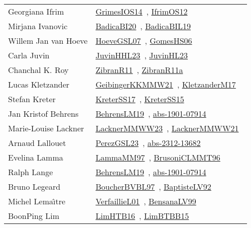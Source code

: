 {\begin{longtable}{p{4cm}p{20cm}}
Georgiana Ifrim & \href{works/GrimesIOS14.pdf}{GrimesIOS14}~\cite{GrimesIOS14}, \href{works/IfrimOS12.pdf}{IfrimOS12}~\cite{IfrimOS12}\\
Mirjana Ivanovic & \href{}{BadicaBI20}~\cite{BadicaBI20}, \href{works/BadicaBIL19.pdf}{BadicaBIL19}~\cite{BadicaBIL19}\\
Willem Jan van Hoeve & \href{works/HoeveGSL07.pdf}{HoeveGSL07}~\cite{HoeveGSL07}, \href{works/GomesHS06.pdf}{GomesHS06}~\cite{GomesHS06}\\
Carla Juvin & \href{works/JuvinHHL23.pdf}{JuvinHHL23}~\cite{JuvinHHL23}, \href{works/JuvinHL23.pdf}{JuvinHL23}~\cite{JuvinHL23}\\
Chanchal K. Roy & \href{works/ZibranR11.pdf}{ZibranR11}~\cite{ZibranR11}, \href{works/ZibranR11a.pdf}{ZibranR11a}~\cite{ZibranR11a}\\
Lucas Kletzander & \href{works/GeibingerKKMMW21.pdf}{GeibingerKKMMW21}~\cite{GeibingerKKMMW21}, \href{works/KletzanderM17.pdf}{KletzanderM17}~\cite{KletzanderM17}\\
Stefan Kreter & \href{works/KreterSS17.pdf}{KreterSS17}~\cite{KreterSS17}, \href{works/KreterSS15.pdf}{KreterSS15}~\cite{KreterSS15}\\
Jan Kristof Behrens & \href{works/BehrensLM19.pdf}{BehrensLM19}~\cite{BehrensLM19}, \href{works/abs-1901-07914.pdf}{abs-1901-07914}~\cite{abs-1901-07914}\\
Marie{-}Louise Lackner & \href{works/LacknerMMWW23.pdf}{LacknerMMWW23}~\cite{LacknerMMWW23}, \href{works/LacknerMMWW21.pdf}{LacknerMMWW21}~\cite{LacknerMMWW21}\\
Arnaud Lallouet & \href{works/PerezGSL23.pdf}{PerezGSL23}~\cite{PerezGSL23}, \href{works/abs-2312-13682.pdf}{abs-2312-13682}~\cite{abs-2312-13682}\\
Evelina Lamma & \href{works/LammaMM97.pdf}{LammaMM97}~\cite{LammaMM97}, \href{works/BrusoniCLMMT96.pdf}{BrusoniCLMMT96}~\cite{BrusoniCLMMT96}\\
Ralph Lange & \href{works/BehrensLM19.pdf}{BehrensLM19}~\cite{BehrensLM19}, \href{works/abs-1901-07914.pdf}{abs-1901-07914}~\cite{abs-1901-07914}\\
Bruno Legeard & \href{}{BoucherBVBL97}~\cite{BoucherBVBL97}, \href{works/BaptisteLV92.pdf}{BaptisteLV92}~\cite{BaptisteLV92}\\
Michel Lema{\^{\i}}tre & \href{works/VerfaillieL01.pdf}{VerfaillieL01}~\cite{VerfaillieL01}, \href{works/BensanaLV99.pdf}{BensanaLV99}~\cite{BensanaLV99}\\
BoonPing Lim & \href{works/LimHTB16.pdf}{LimHTB16}~\cite{LimHTB16}, \href{works/LimBTBB15.pdf}{LimBTBB15}~\cite{LimBTBB15}\\

\end{longtable}}
